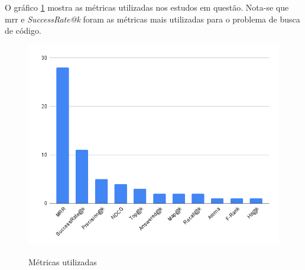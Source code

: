 O gráfico \ref{fig:related-metrics} mostra as métricas utilizadas nos estudos em questão. Nota-se que \gls{mrr} e \textit{SuccessRate@k} foram as métricas mais utilizadas para o problema de busca de código.
\begin{figure}[htbp]
    \centering
        \caption{Métricas utilizadas}
        \includegraphics[scale=0.5]{./resources/images/relacionados/metrics.png}
        \label{fig:related-metrics}
\end{figure}

